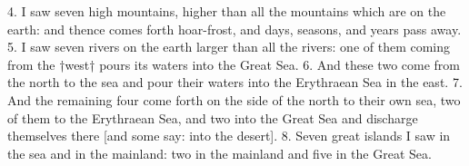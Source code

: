 4. I saw seven high mountains, higher than all
the mountains which are on the earth: and thence
comes forth hoar-frost, and days, seasons, and years
pass away. 5. I saw seven rivers on the earth larger
than all the rivers: one of them coming from the
†west† pours its waters into the Great Sea. 6. And
these two come from the north to the sea and pour
their waters into the Erythraean Sea in the east.
7. And the remaining four come forth on the side
of the north to their own sea, two of them to the
Erythraean Sea, and two into the Great Sea and discharge
themselves there [and some say: into the
desert]. 8. Seven great islands I saw in the sea and
in the mainland: two in the mainland and five in the
Great Sea.


